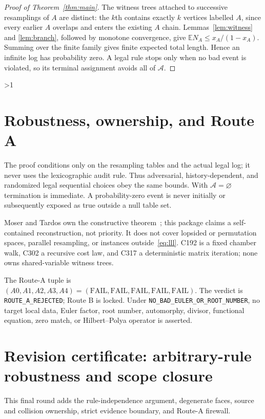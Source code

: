 \documentclass[10pt]{article}
\newcommand{\E}{\mathbb E}
\begin{document}
\begin{proof}[Proof of Theorem~\ref{thm:main}]
The witness trees attached to successive resamplings of $A$ are distinct: the
$k$th contains exactly $k$ vertices labelled $A$, since every earlier $A$
overlaps and enters the existing $A$ chain.  Lemmas~\ref{lem:witness} and
\ref{lem:branch}, followed by monotone convergence, give
$\E N_A\le x_A/(1-x_A)$.  Summing over the finite family gives finite expected
total length.  Hence an infinite log has probability zero.  A legal rule stops
only when no bad event is violated, so its terminal assignment avoids all of
$\mathcal A$.
\end{proof}
\fi

\ifnum\CRevisionRound>1
\section{Robustness, ownership, and Route A}
The proof conditions only on the resampling tables and the actual legal log; it
never uses the lexicographic audit rule.  Thus adversarial, history-dependent,
and randomized legal sequential choices obey the same bounds.  With
$\mathcal A=\varnothing$ termination is immediate.  A probability-zero event is
never initially or subsequently exposed as true outside a null table set.

Moser and Tardos own the constructive theorem~\cite{mt}; this package claims a
self-contained reconstruction, not priority.  It does not cover lopsided or
permutation spaces, parallel resampling, or instances outside~\eqref{eq:lll}.
C192 is a fixed chamber walk, C302 a recursive cost law, and C317 a deterministic
matrix iteration; none owns shared-variable witness trees.

The Route-A tuple is $(A0,A1,A2,A3,A4)=(\mathrm{FAIL},\mathrm{FAIL},
\mathrm{FAIL},\mathrm{FAIL},\mathrm{FAIL})$.  The verdict is
\texttt{ROUTE\_A\_REJECTED}; Route B is locked.  Under
\texttt{NO\_BAD\_EULER\_OR\_ROOT\_NUMBER}, no target local data, Euler factor,
root number, automorphy, divisor, functional equation, zero match, or
Hilbert--Polya operator is asserted.

\section*{Revision certificate: arbitrary-rule robustness and scope closure}
This final round adds the rule-independence argument, degenerate faces, source
and collision ownership, strict evidence boundary, and Route-A firewall.
\fi
\end{document}
